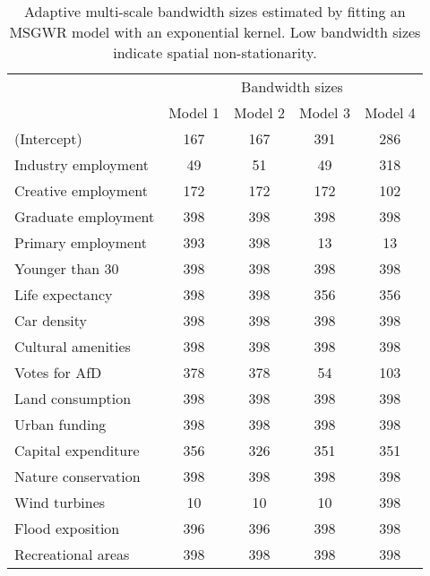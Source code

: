 \begin{table}

\caption[Adaptive multi-scale bandwidth sizes]{\label{tab:msbw}Adaptive multi-scale bandwidth sizes estimated by fitting an MSGWR model with an exponential kernel. Low bandwidth sizes indicate spatial non-stationarity.}
\centering
\begin{tabular}[t]{lcccc}
\toprule
\multicolumn{1}{c}{ } & \multicolumn{4}{c}{Bandwidth sizes} \\
\cmidrule(l{3pt}r{3pt}){2-5}
 & Model 1 & Model 2 & Model 3 & Model 4\\
\midrule
(Intercept) & 167 & 167 & 391 & 286\\
Industry employment & 49 & 51 & 49 & 318\\
Creative employment & 172 & 172 & 172 & 102\\
Graduate employment & 398 & 398 & 398 & 398\\
Primary employment & 393 & 398 & 13 & 13\\
\addlinespace
Younger than 30 & 398 & 398 & 398 & 398\\
Life expectancy & 398 & 398 & 356 & 356\\
Car density & 398 & 398 & 398 & 398\\
Cultural amenities & 398 & 398 & 398 & 398\\
Votes for AfD & 378 & 378 & 54 & 103\\
\addlinespace
Land consumption & 398 & 398 & 398 & 398\\
Urban funding & 398 & 398 & 398 & 398\\
Capital expenditure & 356 & 326 & 351 & 351\\
Nature conservation & 398 & 398 & 398 & 398\\
Wind turbines & 10 & 10 & 10 & 398\\
\addlinespace
Flood exposition & 396 & 396 & 398 & 398\\
Recreational areas & 398 & 398 & 398 & 398\\
\bottomrule
\end{tabular}
\end{table}